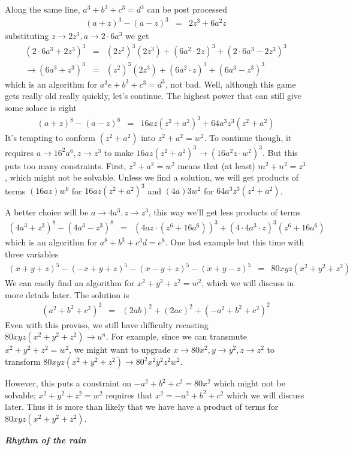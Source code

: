 \documentclass[aps,preprint,preprintnumbers,nofootinbib,showpacs,prd]{revtex4-1}
\newcommand{\nbea}{\begin{eqnarray*}}
\newcommand{\neea}{\end{eqnarray*}}
\begin{document}
Along the same line, $a^3 + b^3 + c^3 = d^3$ can be post processed
%
\nbea
(a+z)^3 - (a-z)^3 & = & 2 z^3 + 6 a^2 z
\neea
%
substituting $z \rightarrow 2 z^3, a \rightarrow 2 \cdot 6 a^3$ we get
%
\nbea
(2 \cdot 6 a^3 + 2 z^3)^3 & = & (2 z^2)^3 (2 z^3) + (6 a^2 \cdot 2 z)^3 + (2 \cdot 6 a^3 - 2 z^3)^3 \\
\rightarrow (6 a^3 + z^3)^3 & = & (z^2)^3 (2 z^3) + (6 a^2 \cdot z)^3 + (6 a^3 - z^3)^3
\neea
%
which is an algorithm for $a^3 e + b^3 + c^3 = d^3$, not bad. Well, although this game gets really old really quickly, let's continue. The highest power that can still give some solace is eight
%
\nbea
(a+z)^8 - (a-z)^8 & = & 16 a z (z^2+a^2)^3 + 64 a^3 z^3 (z^2+a^2)
\neea
%
It's tempting to conform $(z^2+a^2)$ into $z^2+a^2 = w^2$. To continue though, it requires $a \rightarrow 16^2 a^6, z \rightarrow z^3$ to make $16 a z (z^2+a^2)^3 \rightarrow (16 a^2 z \cdot w^2)^3$. But this puts too many constraints. First, $z^2+a^2 = w^2$ means that (at least) $m^2 + n^2 = z^3$, which might not be solvable. Unless we find a solution, we will get products of terms $(16 a z) w^6$ for $16 a z (z^2+a^2)^3$ and $(4 a )3 w^2$ for $64 a^3 z^3 (z^2+a^2)$.

A better choice will be $a \rightarrow 4 a^3, z \rightarrow z^3$, this way we'll get less products of terms
%
\nbea
(4 a^3+z^3)^8 - (4 a^3-z^3)^8 & = & (4 a z \cdot (z^6+16 a^6))^3 + (4 \cdot 4 a^3 \cdot z)^3 (z^6+16 a^6)
\neea
%
which is an algorithm for $a^8 + b^3 + c^3 d = e^8$. One last example but this time with three variables
%
\nbea
(x+y+z)^5 - (-x+y+z)^5 - (x-y+z)^5 - (x+y-z)^5 & = & 80 x y z(x^2+y^2+z^2)
\neea
%
We can easily find an algorithm for $x^2+y^2+z^2 = w^2$, which we will discuss in more details later. The solution is
%
\nbea
(a^2+b^2+c^2)^2 & = & (2ab)^2 + (2ac)^2 + (-a^2 + b^2 + c^2)^2
\neea
%
Even with this proviso, we still have difficulty recasting $80 x y z(x^2+y^2+z^2) \rightarrow u^n$. For example, since we can transmute $x^2+y^2+z^2 = w^2$, we might want to upgrade $x \rightarrow 80 x^2, y \rightarrow y^2, z \rightarrow z^2$ to transform $80 x y z(x^2+y^2+z^2) \rightarrow  80^2 x^2 y^2 z^2 w^2$.

However, this puts a constraint on $-a^2 + b^2 + c^2 = 80 x^2$ which might not be solvable;  $x^2+y^2+z^2 = w^2$ requires that $x^2 = -a^2 + b^2 + c^2$ which we will discuss later. Thus it is more than likely that we have have a product of terms for $80 x y z(x^2+y^2+z^2)$.

\bigskip\textbf{\textit{Rhythm of the rain}}
\end{document}
